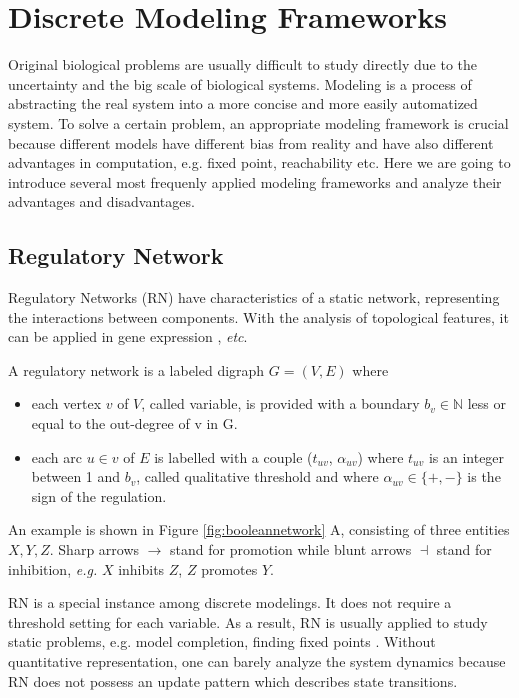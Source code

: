 \section{Discrete Modeling Frameworks}
Original biological problems are usually difficult to study directly due to the uncertainty and the big scale of biological systems. 
Modeling is a process of abstracting the real system into a more concise and more easily automatized system.
To solve a certain problem, an appropriate modeling framework is crucial because different models have different bias from reality and have also different advantages in computation, e.g. fixed point, reachability etc.
Here we are going to introduce several most frequenly applied modeling frameworks and analyze their advantages and disadvantages.

\subsection{Regulatory Network}\label{sec:regNetwork}
Regulatory Networks (RN) have characteristics of a static network, representing the interactions between components.
With the analysis of topological features, it can be applied in gene expression \cite{shinozaki2003regulatory}, \textit{etc}.

\begin{definition}\label{def:RN}
A regulatory network is a labeled digraph $G=(V,E)$ where 
\begin{itemize}
    \item each vertex $v$ of $V$, called variable, is provided with a boundary $b_v\in \mathbb{N}$ less or equal to the out-degree of v in G.
    \item each arc $u\in v$ of $E$ is labelled with a couple ($t_{uv}$, $\alpha_{uv}$) where $t_{uv}$ is an integer between 1 and $b_v$, called qualitative threshold and where $\alpha_{uv}\in \{+,-\}$ is the sign of the regulation.
\end{itemize}
\end{definition}

An example is shown in Figure \ref{fig:booleannetwork} A, consisting of three entities $X,Y,Z$.
Sharp arrows $\to$ stand for promotion while blunt arrows $\dashv$ stand for inhibition,
\textit{e.g.} $X$ inhibits $Z$, $Z$ promotes $Y$.

RN is a special instance among discrete modelings.
It does not require a threshold setting for each variable.
As a result, RN is usually applied to study static problems, e.g. model completion, finding fixed points \cite{yamamoto2014completing}.
Without quantitative representation, one can barely analyze the system dynamics because RN does not possess an update pattern which describes state transitions.

